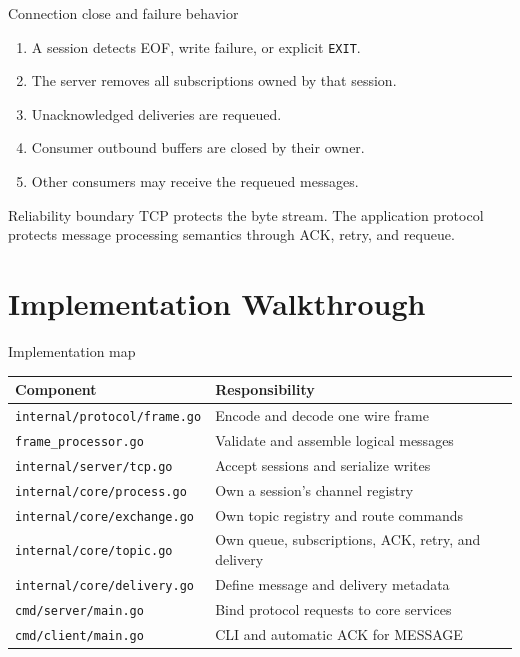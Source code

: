 \documentclass[aspectratio=169,10pt]{beamer}
\newcommand{\code}[1]{\texttt{\small #1}}
\begin{document}
\begin{frame}{Connection close and failure behavior}
  \begin{enumerate}
    \item A session detects EOF, write failure, or explicit \code{EXIT}.
    \item The server removes all subscriptions owned by that session.
    \item Unacknowledged deliveries are requeued.
    \item Consumer outbound buffers are closed by their owner.
    \item Other consumers may receive the requeued messages.
  \end{enumerate}
  \vspace{.45em}
  \begin{alertblock}{Reliability boundary}
    TCP protects the byte stream. The application protocol protects message
    processing semantics through ACK, retry, and requeue.
  \end{alertblock}
\end{frame}

\section{Implementation Walkthrough}

\begin{frame}{Implementation map}
  \small
  \begin{tabular}{p{}p{}}
    \toprule
    Component & Responsibility \\
    \midrule
    \code{internal/protocol/frame.go} & Encode and decode one wire frame \\
    \code{frame\_processor.go} & Validate and assemble logical messages \\
    \code{internal/server/tcp.go} & Accept sessions and serialize writes \\
    \code{internal/core/process.go} & Own a session's channel registry \\
    \code{internal/core/exchange.go} & Own topic registry and route commands \\
    \code{internal/core/topic.go} & Own queue, subscriptions, ACK, retry, and delivery \\
    \code{internal/core/delivery.go} & Define message and delivery metadata \\
    \code{cmd/server/main.go} & Bind protocol requests to core services \\
    \code{cmd/client/main.go} & CLI and automatic ACK for MESSAGE \\
    \bottomrule
  \end{tabular}
\end{frame}
\end{document}
